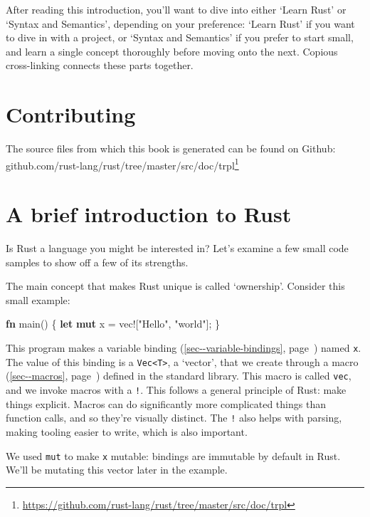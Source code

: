 \documentclass[a4paper,]{book}
\renewcommand*{\hyperref}[2][\ar]{%
  \def\ar{#2}%
  #2 (\autoref{#1}, page~\pageref{#1})}
\newenvironment{Shaded}{\begin{snugshade}}{\end{snugshade}}
\newcommand{\KeywordTok}[1]{\textcolor[rgb]{0.13,0.29,0.53}{\textbf{{#1}}}}
\newcommand{\StringTok}[1]{\textcolor[rgb]{0.31,0.60,0.02}{{#1}}}
\newcommand{\OtherTok}[1]{\textcolor[rgb]{0.56,0.35,0.01}{{#1}}}
\newcommand{\NormalTok}[1]{{#1}}
\renewcommand{\href}[2]{#2\footnote{\url{#1}}}
\begin{document}
After reading this introduction, you'll want to dive into either `Learn
Rust' or `Syntax and Semantics', depending on your preference: `Learn
Rust' if you want to dive in with a project, or `Syntax and Semantics'
if you prefer to start small, and learn a single concept thoroughly
before moving onto the next. Copious cross-linking connects these parts
together.

\section{Contributing}\label{contributing}

The source files from which this book is generated can be found on
Github:
\href{https://github.com/rust-lang/rust/tree/master/src/doc/trpl}{github.com/rust-lang/rust/tree/master/src/doc/trpl}

\section{A brief introduction to
Rust}\label{a-brief-introduction-to-rust}

Is Rust a language you might be interested in? Let's examine a few small
code samples to show off a few of its strengths.

The main concept that makes Rust unique is called `ownership'. Consider
this small example:

\begin{Shaded}
\begin{Highlighting}[]
\KeywordTok{fn} \NormalTok{main() \{}
    \KeywordTok{let} \KeywordTok{mut} \NormalTok{x = }\OtherTok{vec!}\NormalTok{[}\StringTok{"Hello"}\NormalTok{, }\StringTok{"world"}\NormalTok{];}
\NormalTok{\}}
\end{Highlighting}
\end{Shaded}

This program makes a \hyperref[sec--variable-bindings]{variable binding}
named \texttt{x}. The value of this binding is a
\texttt{Vec\textless{}T\textgreater{}}, a `vector', that we create
through a \hyperref[sec--macros]{macro} defined in the standard library.
This macro is called \texttt{vec}, and we invoke macros with a
\texttt{!}. This follows a general principle of Rust: make things
explicit. Macros can do significantly more complicated things than
function calls, and so they're visually distinct. The \texttt{!} also
helps with parsing, making tooling easier to write, which is also
important.

We used \texttt{mut} to make \texttt{x} mutable: bindings are immutable
by default in Rust. We'll be mutating this vector later in the example.
\end{document}
